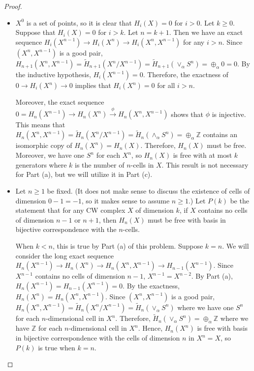 \documentclass[psamsfonts]{amsart}
\theoremstyle{definition}
\theoremstyle{remark}
\numberwithin{equation}{section}
\begin{document}
\begin{proof}
$ $
  \begin{itemize}
    \item
      $X^0$ is a set of points, so it is clear that $H_i(X) = 0$ for $i > 0$.
      Let $k \geq 0$.
      Suppose that $H_i(X) = 0$ for $i > k$.
      Let $n = k + 1$.
      Then we have an exact sequence $H_{i}(X^{n - 1}) \rightarrow H_{i}(X^n) \rightarrow H_{i}(X^n, X^{n - 1})$ for any $i > n$.
      Since $(X^n, X^{n - 1})$ is a good pair, $H_{n + 1}(X^n, X^{n - 1}) = \tilde{H}_{n + 1}(X^n / X^{n - 1}) = \tilde{H}_{n + 1}(\vee_{\alpha} S^n) = \oplus_{\alpha} 0 = 0$.
      By the inductive hypothesis, $H_i(X^{n - 1}) = 0$.
      Therefore, the exactness of $0 \rightarrow H_i(X^n) \rightarrow 0$ implies that $H_i(X^n) = 0$ for all $i > n$.

      Moreover, the exact sequence $0 = H_n(X^{n - 1}) \rightarrow H_n(X^n) \xrightarrow{\phi} H_n(X^n, X^{n - 1})$ shows that $\phi$ is injective.
      This means that $H_n(X^n, X^{n - 1}) = \tilde{H}_n(X^n / X^{n - 1}) = \tilde{H}_n(\wedge_{\alpha} S^n) = \oplus_{\alpha} \mathbb{Z}$ contains an isomorphic copy of $H_n(X^n) = H_n(X)$.
      Therefore, $H_n(X)$ must be free.
      Moreover, we have one $S^n$ for each $X^n$, so $H_n(X)$ is free with at most $k$ generators where $k$ is the number of $n$-cells in $X$.
      This result is not necessary for Part (a), but we will utilize it in Part (c).
    \item
      Let $n \geq 1$ be fixed.
      (It does not make sense to discuss the existence of cells of dimension $0 - 1 = -1$, so it makes sense to assume $n \geq 1$.)
      Let $P(k)$ be the statement that for any CW complex $X$ of dimension $k$, if $X$ contains no cells of dimension $n - 1$ or $n + 1$, then $H_n(X)$ must be free with basis in bijective correspondence with the $n$-cells.

      When $k < n$, this is true by Part (a) of this problem.
      Suppose $k = n$.
      We will consider the long exact sequence $H_n(X^{n - 1}) \rightarrow H_n(X^n) \rightarrow H_n(X^n, X^{n - 1}) \rightarrow H_{n - 1}(X^{n - 1})$.
      Since $X^{n - 1}$ contains no cells of dimension $n - 1$, $X^{n - 1} = X^{n - 2}$.
      By Part (a), $H_n(X^{n - 1}) = H_{n - 1}(X^{n - 1}) = 0$.
      By the exactness, $H_n(X^n) = H_n(X^n, X^{n - 1})$.
      Since $(X^n, X^{n - 1})$ is a good pair, $H_n(X^n, X^{n - 1}) = \tilde{H}_n(X^n / X^{n - 1}) = \tilde{H}_n(\vee_{\alpha} S^n)$ where we have one $S^n$ for each $n$-dimensional cell in $X^n$.
      Therefore, $\tilde{H}_n(\vee_{\alpha} S^n) = \oplus_{\alpha} \mathbb{Z}$ where we have $\mathbb{Z}$ for each $n$-dimensional cell in $X^n$.
      Hence, $H_n(X^n)$ is free with basis in bijective correspondence with the cells of dimension $n$ in $X^n = X$, so $P(k)$ is true when $k = n$.


\end{itemize}
\end{proof}
\end{document}
